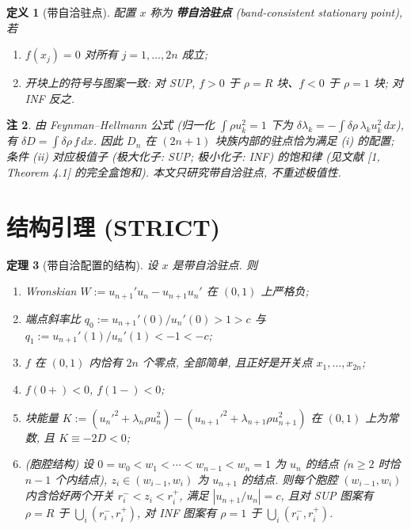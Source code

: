 \documentclass[UTF8]{ctexart}
\newtheorem{theorem}{定理}[section]
\newtheorem{remark}[theorem]{注}
\newtheorem{definition}[theorem]{定义}
\begin{document}
\begin{definition}[带自洽驻点]\label{def:bc}
配置 $x$ 称为 \textbf{带自洽驻点} (band-consistent stationary point), 若
\begin{enumerate}
	\item[(i)] $f(x_j)=0$ 对所有 $j=1,\dots,2n$ 成立;
	\item[(ii)] 开块上的符号与图案一致: 对 SUP, $f>0$ 于 $\rho=R$ 块、$f<0$ 于
	$\rho=1$ 块; 对 INF 反之.
\end{enumerate}
\end{definition}

\begin{remark}\label{rem:fh}
由 Feynman--Hellmann 公式 (归一化 $\int\rho u_k^2=1$ 下为
$\delta\lambda_k=-\int\delta\rho\,\lambda_ku_k^2\,dx$), 有 $\delta D=\int\delta\rho\, f\,dx$.
因此 $D_n$ 在 $(2n+1)$ 块族内部的驻点恰为满足 (i) 的配置; 条件 (ii) 对应极值子
(极大化子: SUP; 极小化子: INF) 的饱和律 (见文献 [1, Theorem 4.1] 的完全盒饱和).
本文只研究带自洽驻点, 不重述极值性.
\end{remark}

\section{结构引理 (STRICT)}\label{sec:structure}

\begin{theorem}[带自洽配置的结构]\label{thm:structure}
设 $x$ 是带自洽驻点. 则
\begin{enumerate}
	\item[(a)] Wronskian $W:=u_{n+1}'u_n-u_{n+1}u_n'$ 在 $(0,1)$ 上严格负;
	\item[(b)] 端点斜率比 $q_0:=u_{n+1}'(0)/u_n'(0)>1>c$ 与
	$q_1:=u_{n+1}'(1)/u_n'(1)<-1<-c$;
	\item[(c)] $f$ 在 $(0,1)$ 内恰有 $2n$ 个零点, 全部简单, 且正好是开关点
	$x_1,\dots,x_{2n}$;
	\item[(d)] $f(0+)<0$, $f(1-)<0$;
	\item[(e)] 块能量 $K:=(u_n'^2+\lambda_n\rho u_n^2)-(u_{n+1}'^2+\lambda_{n+1}\rho u_{n+1}^2)$
	在 $(0,1)$ 上为常数, 且 $K\equiv-2D<0$;
	\item[(f)] (胞腔结构) 设 $0=w_0<w_1<\cdots<w_{n-1}<w_n=1$ 为 $u_n$ 的结点
	($n\ge2$ 时恰 $n-1$ 个内结点), $z_i\in(w_{i-1},w_i)$ 为 $u_{n+1}$ 的结点.
	则每个胞腔 $(w_{i-1},w_i)$ 内含恰好两个开关 $r_i^-<z_i<r_i^+$, 满足
	$|u_{n+1}/u_n|=c$, 且对 SUP 图案有 $\rho=R$ 于 $\bigcup_i(r_i^-,r_i^+)$,
	对 INF 图案有 $\rho=1$ 于 $\bigcup_i(r_i^-,r_i^+)$.
\end{enumerate}
\end{theorem}
\end{document}
